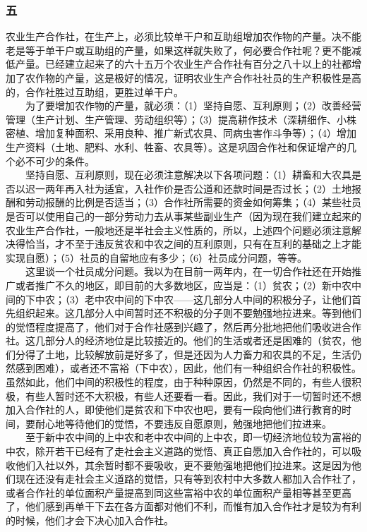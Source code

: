 \documentclass[cn,11pt,chinese]{elegantbook}
\def\myformat#1{\hfil\hfil #1}
\begin{document}
\subsubsection*{\myformat{五}}
农业生产合作社，在生产上，必须比较单干户和互助组增加农作物的产量。决不能老是等于单干户或互助组的产量，如果这样就失败了，何必要合作社呢？更不能减低产量。已经建立起来了的六十五万个农业生产合作社有百分之八十以上的社都增加了农作物的产量，这是极好的情况，证明农业生产合作社社员的生产积极性是高的，合作社胜过互助组，更胜过单干户。\\
　　为了要增加农作物的产量，就必须：（1）坚持自愿、互利原则；（2）改善经营管理（生产计划、生产管理、劳动组织等）；（3）提高耕作技术（深耕细作、小株密植、增加复种面积、采用良种、推广新式农具、同病虫害作斗争等）；（4）增加生产资料（土地、肥料、水利、牲畜、农具等）。这是巩固合作社和保证增产的几个必不可少的条件。\\
　　坚持自愿、互利原则，现在必须注意解决以下各项问题：（1）耕畜和大农具是否以迟一两年再入社为适宜，入社作价是否公道和还款时间是否过长；（2）土地报酬和劳动报酬的比例是否适当；（3）合作社所需要的资金如何筹集；（4）某些社员是否可以使用自己的一部分劳动力去从事某些副业生产（因为现在我们建立起来的农业生产合作社，一般地还是半社会主义性质的，所以，上述四个问题必须注意解决得恰当，才不至于违反贫农和中农之间的互利原则，只有在互利的基础之上才能实现自愿）；（5）社员的自留地应有多少；（6）社员成分问题，等等。\\
　　这里谈一个社员成分问题。我以为在目前一两年内，在一切合作社还在开始推广或者推广不久的地区，即目前的大多数地区，应当是：（1）贫农；（2）新中农中间的下中农；（3）老中农中间的下中农——这几部分人中间的积极分子，让他们首先组织起来。这几部分人中间暂时还不积极的分子则不要勉强地拉进来。等到他们的觉悟程度提高了，他们对于合作社感到兴趣了，然后再分批地把他们吸收进合作社。这几部分人的经济地位是比较接近的。他们的生活或者还是困难的（贫农，他们分得了土地，比较解放前是好多了，但是还因为人力畜力和农具的不足，生活仍然感到困难），或者还不富裕（下中农），因此，他们有一种组织合作社的积极性。虽然如此，他们中间的积极性的程度，由于种种原因，仍然是不同的，有些人很积极，有些人暂时还不大积极，有些人还要看一看。因此，我们对于一切暂时还不想加入合作社的人，即使他们是贫农和下中农也吧，要有一段向他们进行教育的时间，要耐心地等待他们的觉悟，不要违反自愿原则，勉强地把他们拉进来。\\
　　至于新中农中间的上中农和老中农中间的上中农，即一切经济地位较为富裕的中农，除开若干已经有了走社会主义道路的觉悟、真正自愿加入合作社的，可以吸收他们入社以外，其余暂时都不要吸收，更不要勉强地把他们拉进来。这是因为他们现在还没有走社会主义道路的觉悟，只有等到农村中大多数人都加入合作社了，或者合作社的单位面积产量提高到同这些富裕中农的单位面积产量相等甚至更高了，他们感到再单干下去在各方面都对他们不利，而惟有加入合作社才是较为有利的时候，他们才会下决心加入合作社。\\
\end{document}
